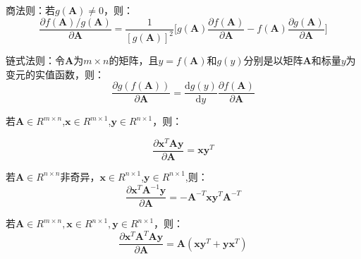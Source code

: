 \documentclass[10pt,a4paper,UTF8]{article}
\begin{document}
\begin{tikzinstance}
商法则：若\(g(\mathbf{A})\neq 0\)，则：
\begin{equation}
\label{eq:28}
\frac{\partial f(\mathbf{A})/g(\mathbf{A})}{\partial \mathbf{A}} = \frac{1}{[g(\mathbf{A})]^{2}} \bigg[  g(\mathbf{A}) \frac{\partial f(\mathbf{A})}{\partial \mathbf{A}}  - f(\mathbf{A}) \frac{\partial g(\mathbf{A})}{\partial \mathbf{A}} \bigg]
\end{equation}
\end{tikzinstance}

\begin{tikzinstance}


链式法则：令\(\mathbf{A}\)为\(m\times n\)的矩阵，且\(y=f(\mathbf{A})\)和\(g(y)\)分别是以矩阵\(\mathbf{A}\)和标量\(y\)为变元的实值函数，则：
\begin{equation}
\label{eq:29}
\frac{\partial g(f(\mathbf{A}))}{\partial \mathbf{A}} = \frac{\mathrm{d}g(y)}{\mathrm{d} y}\frac{\partial f(\mathbf{A})}{\partial \mathbf{A}}
\end{equation}
\end{tikzinstance}

\begin{tikzinstance}


若\(\mathbf{A}\in R^{m\times n}\),\(\mathbf{x}\in R^{m\times 1}\),\(\mathbf{y}\in R^{n\times 1}\)，则：

\begin{equation}
\label{eq:30}
\frac{\partial \mathbf{x}^{T}\mathbf{A}\mathbf{y}}{\partial \mathbf{A}} = \mathbf{x}\mathbf{y}^{T}
\end{equation}
\end{tikzinstance}

\begin{tikzinstance}


若\(\mathbf{A}\in R^{n\times n}\)非奇异，\(\mathbf{x}\in R^{n\times 1}\),\(\mathbf{y}\in R^{n\times 1}\),则：
\begin{equation}
\label{eq:31}
\frac{\partial \mathbf{x}^{T} \mathbf{A}^{-1}\mathbf{y}}{\partial \mathbf{A}} = -\mathbf{A}^{-T}\mathbf{x}\mathbf{y}^{T}\mathbf{A}^{-T}
\end{equation}
\end{tikzinstance}


\begin{tikzinstance}


若\(\mathbf{A}\in R^{m\times n},\mathbf{x}\in R^{n\times 1},\mathbf{y}\in R^{n\times 1}\)，则：
\begin{equation}
\label{eq:32}
\frac{\partial \mathbf{x}^{T} \mathbf{A}^{T}\mathbf{A}\mathbf{y}}{\partial \mathbf{A}} = \mathbf{A}(\mathbf{x}\mathbf{y}^{T} + \mathbf{y}\mathbf{x}^{T})
\end{equation}
\end{tikzinstance}
\end{document}
